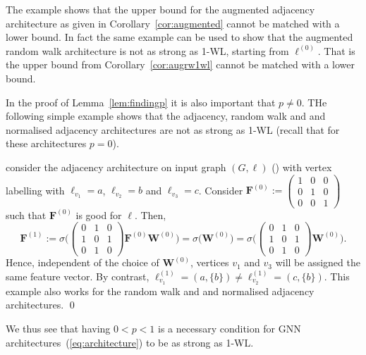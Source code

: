 The example shows that the upper bound for the augmented adjacency architecture as given in Corollary~\ref{cor:augmented} cannot be matched with a lower bound.
In fact the same example can be used to show that the augmented random walk architecture is not as strong as 1-WL, starting from $\pmb{\ell}^{(0)}$. That is the upper bound from Corollary~\ref{cor:augrw1wl} cannot be matched with a lower bound.

In the proof of  Lemma~\ref{lem:findingp} it is also important that $p\neq 0$. THe following simple example shows that the adjacency, random walk and and normalised adjacency architectures are not as strong as 1-WL (recall that for these architectures $p=0$).

\begin{example}\label{example:piszero}
consider the  adjacency architecture on input graph  $(G,\pmb{\ell})$
() with 
vertex labelling with $\pmb{\ell}_{v_1}=a$, $\pmb{\ell}_{v_2}=b$ and $\pmb{\ell}_{v_3}=c$.
Consider $\mathbf{F}^{(0)}:=\left(\begin{smallmatrix}1 & 0 & 0\\
0 & 1 & 0\\
0 & 0 & 1\end{smallmatrix}\right)$ such that $\mathbf{F}^{(0)}$ is good for $\pmb{\ell}$.
Then,
$$
\mathbf{F}^{(1)}:=\sigma\Biggl(\begin{pmatrix}0 & 1 & 0 \\
1 & 0 & 1\\
0 & 1 & 0
\end{pmatrix}\mathbf{F}^{(0)}\mathbf{W}^{(0)}\Biggr)
=\sigma(\mathbf{W}^{(0)}\Biggr)=
\sigma\Biggl(\begin{pmatrix}0 & 1 & 0 \\
1 & 0 & 1\\
0 & 1 & 0
\end{pmatrix}\mathbf{W}^{(0)}\Biggr).
$$
Hence, independent of the choice of $\mathbf{W}^{(0)}$,  vertices $v_1$ and $v_3$ will be assigned the same
feature vector. By contrast, $\pmb{\ell}^{(1)}_{v_1}=(a,\{b\})\neq \pmb{\ell}^{(1)}_{v_2}=(c,\{b\})$.
This example also works for the random walk and and normalised adjacency architectures. \qed
\end{example}

We thus see that having $0<p<1$ is a necessary condition for GNN architectures~(\ref{eq:architecture})
to be as strong as 1-WL.

